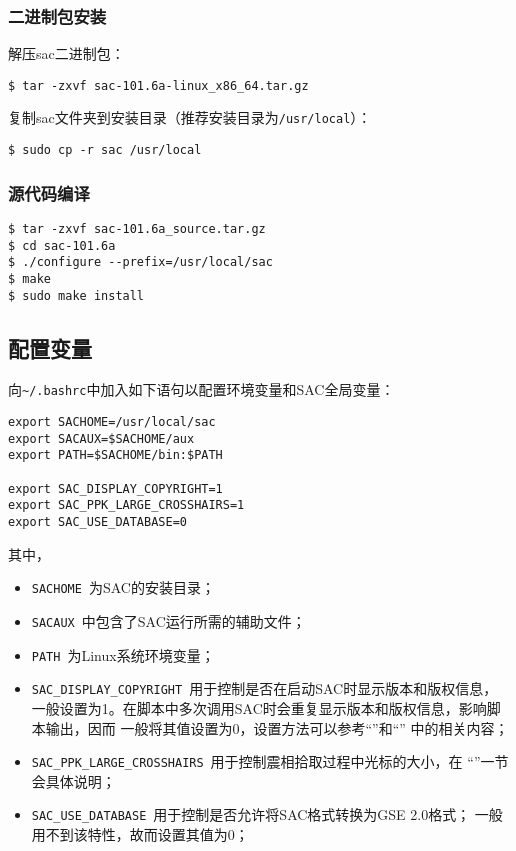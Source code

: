 \subsubsection*{二进制包安装}
解压sac二进制包：
\begin{lstlisting}[style=Shell]
$ tar -zxvf sac-101.6a-linux_x86_64.tar.gz
\end{lstlisting}

复制sac文件夹到安装目录（推荐安装目录为\lstinline{/usr/local}）：
\begin{lstlisting}[style=Shell]
$ sudo cp -r sac /usr/local
\end{lstlisting}

\subsubsection*{源代码编译}
\begin{lstlisting}[style=Shell]
$ tar -zxvf sac-101.6a_source.tar.gz
$ cd sac-101.6a
$ ./configure --prefix=/usr/local/sac
$ make
$ sudo make install
\end{lstlisting}

\subsection*{配置变量}
向\lstinline{~/.bashrc}中加入如下语句以配置环境变量和SAC全局变量：
\begin{lstlisting}[style=Bash]
export SACHOME=/usr/local/sac
export SACAUX=$SACHOME/aux
export PATH=$SACHOME/bin:$PATH

export SAC_DISPLAY_COPYRIGHT=1
export SAC_PPK_LARGE_CROSSHAIRS=1
export SAC_USE_DATABASE=0
\end{lstlisting}

其中，
\begin{itemize}
\item \lstinline{SACHOME}~为SAC的安装目录；
\item \lstinline{SACAUX}~中包含了SAC运行所需的辅助文件；
\item \lstinline{PATH}~为Linux系统环境变量；
\item \lstinline{SAC_DISPLAY_COPYRIGHT}~用于控制是否在启动SAC时显示版本和版权信息，
    一般设置为1。在脚本中多次调用SAC时会重复显示版本和版权信息，影响脚本输出，因而
    一般将其值设置为0，设置方法可以参考``''和``''
    中的相关内容；
\item \lstinline{SAC_PPK_LARGE_CROSSHAIRS}~用于控制震相拾取过程中光标的大小，在
    ``''一节会具体说明；
\item \lstinline{SAC_USE_DATABASE}~用于控制是否允许将SAC格式转换为GSE 2.0格式；
    一般用不到该特性，故而设置其值为0；
\end{itemize}

